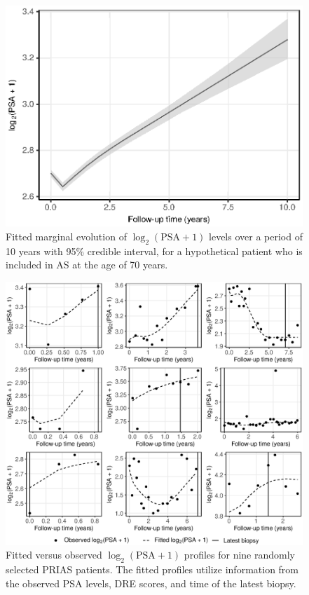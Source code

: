 \begin{figure}[!htb]
\centerline{\includegraphics[width=0.7\columnwidth]{images/marginal_psa.eps}}
\caption{Fitted marginal evolution of $\log_2 (\mbox{PSA} + 1)$ levels over a period of 10 years with 95\% credible interval, for a hypothetical patient who is included in AS at the age of 70 years.}
\label{fig:fitted_marginal_psa}
\end{figure}

\begin{figure}[!htb]
\centerline{\includegraphics[width=\columnwidth]{images/fitted_9subject_psa.eps}}
\caption{Fitted versus observed ${\log_2 (\mbox{PSA} + 1)}$ profiles for nine randomly selected PRIAS patients. The fitted profiles utilize information from the observed PSA levels, DRE scores, and time of the latest biopsy.}
\label{fig:fitted_9subject_psa}
\end{figure}

